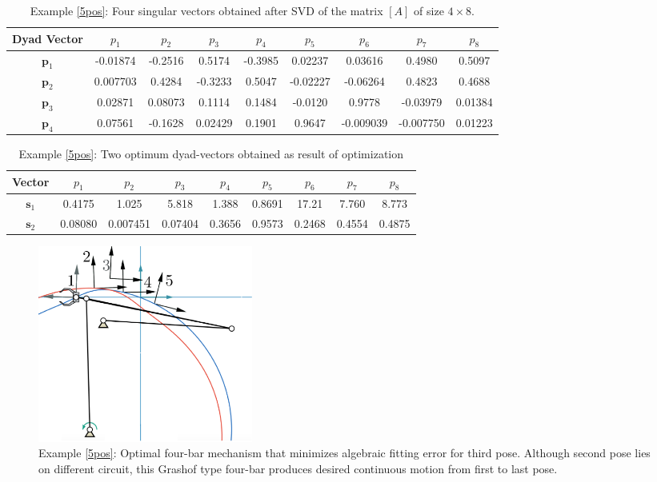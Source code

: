 \documentclass[twocolumn,10pt]{asme2ej}
\begin{document}
\begin{table}[thb]
  \caption{Example \ref{5pos}: Four singular vectors obtained after SVD of the matrix $[A]$ of size $4\times8$.}
  \centering
  \begin{tabular}{ccccccccc}
  \hline
  Dyad Vector &$p_1$&$p_2$&$p_3$&$p_4$&$p_5$&$p_6$&$p_7$&$p_8$\\
    \hline
   $\textbf{p}_1$& -0.01874 & -0.2516 & 0.5174 & -0.3985 & 0.02237 & 0.03616 & 0.4980 & 0.5097\\
$\textbf{p}_2$&0.007703 & 0.4284 & -0.3233 & 0.5047 & -0.02227 & -0.06264 & 0.4823 & 0.4688\\
$\textbf{p}_3$& 0.02871 & 0.08073 & 0.1114 & 0.1484 & -0.0120 & 0.9778 & -0.03979 & 0.01384\\
$\textbf{p}_4$& 0.07561 & -0.1628 & 0.02429 & 0.1901 & 0.9647 & -0.009039 & -0.007750 & 0.01223\\
    \hline
  \end{tabular}
  \label{svectors5pos}
\end{table}

\begin{table}[thb]
  \caption{Example \ref{5pos}: Two optimum dyad-vectors obtained as result of optimization}
  \centering
  \begin{tabular}{ccccccccc}
  \hline
  Vector &$p_1$&$p_2$&$p_3$&$p_4$&$p_5$&$p_6$&$p_7$&$p_8$\\
   \hline
$\textbf{s}_1$&0.4175 & 1.025 & 5.818 & 1.388 & 0.8691 & 17.21 & 7.760 & 8.773 \\
$\textbf{s}_2$&0.08080 & 0.007451 & 0.07404 & 0.3656 & 0.9573 & 0.2468 & 0.4554 & 0.4875\\
   \hline
  \end{tabular}
  \label{dyadvectors5pos}
\end{table}

\begin{figure}
\centering
\includegraphics[width=200pt]{figure/fig1.eps}
\caption{Example \ref{5pos}: Optimal four-bar mechanism that minimizes algebraic fitting error for third pose. Although second pose lies on different circuit, this Grashof type four-bar produces desired continuous motion from first to last pose.}
\label{5posgg}
\end{figure}
\end{document}
